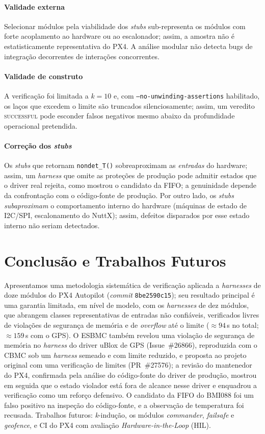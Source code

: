 \documentclass[conference]{IEEEtran}
\begin{document}
\paragraph{Validade externa}
Selecionar módulos pela viabilidade dos \textit{stubs} sub-representa
os módulos com forte acoplamento ao hardware ou ao escalonador; assim,
a amostra não é estatisticamente representativa do PX4. A análise
modular não detecta bugs de integração decorrentes de interações
concorrentes.

\paragraph{Validade de construto}
A verificação foi limitada a $k=10$ e, com
\texttt{--no-unwinding-assertions} habilitado, os laços que excedem o
limite são truncados silenciosamente; assim, um veredito
\textsc{successful} pode esconder falsos negativos mesmo abaixo da
profundidade operacional pretendida.

\paragraph{Correção dos \textit{stubs}}
Os \textit{stubs} que retornam \texttt{nondet\_T()} sobreaproximam as
\emph{entradas} do hardware; assim, um \textit{harness} que omite as
proteções de produção pode admitir estados que o driver real rejeita,
como mostrou o candidato da FIFO; a genuinidade depende da
confrontação com o código-fonte de produção. Por outro lado, os
\textit{stubs} \emph{subaproximam} o comportamento interno do
hardware (máquinas de estado de I2C/SPI, escalonamento do NuttX);
assim, defeitos disparados por esse estado interno não seriam
detectados.

\section{Conclusão e Trabalhos Futuros}
\label{sec:conclusion}

Apresentamos uma metodologia sistemática de verificação aplicada a
\textit{harnesses} de doze módulos do PX4 Autopilot (\textit{commit}
\texttt{8be2590c15}); seu resultado principal é uma garantia
limitada, em nível de modelo, com os \textit{harnesses} de dez
módulos, que abrangem classes representativas de entradas não
confiáveis, verificados livres de violações de segurança de memória
e de \textit{overflow} até o limite (${\approx}94$\,s no total;
${\approx}159$\,s com o GPS). O ESBMC também revelou uma violação de
segurança de memória no \textit{harness} do driver uBlox de GPS
(Issue~\#26866), reproduzida com o CBMC sob um \textit{harness}
semeado e com limite reduzido, e proposta ao projeto original com uma
verificação de limites (PR~\#27576); a revisão do mantenedor do PX4,
confirmada pela análise do código-fonte do driver de produção,
mostrou em seguida que o estado violador está fora de alcance nesse
driver e enquadrou a verificação como um reforço defensivo.
O candidato da FIFO do BMI088 foi um falso positivo na inspeção do
código-fonte, e a observação de temperatura foi recusada.
Trabalhos futuros: \textit{k}-indução, os módulos \textit{commander},
\textit{failsafe} e \textit{geofence}, e CI do PX4 com avaliação
\textit{Hardware-in-the-Loop} (HIL).
\end{document}
